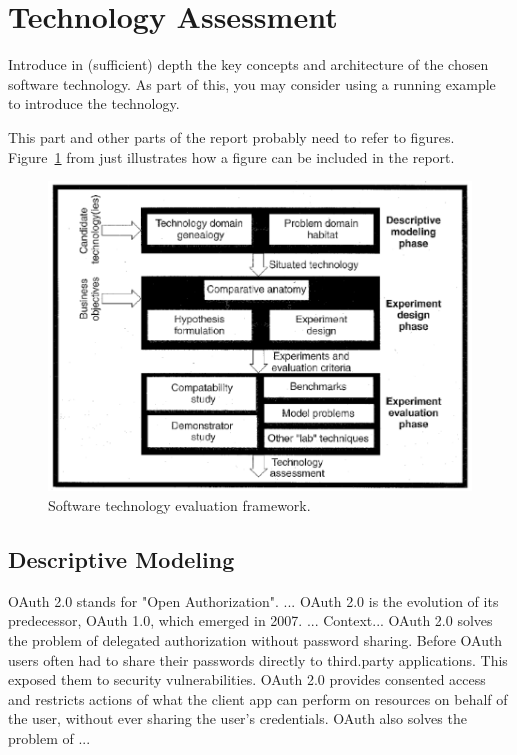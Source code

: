 \section{Technology Assessment}
\label{sec:technology}

Introduce in (sufficient) depth the key concepts and architecture of the chosen software technology. As part of this, you may consider using a running example to introduce the technology.

This part and other parts of the report probably need to refer to
figures. Figure~\ref{fig:framework} from \cite{brown:96} just
illustrates how a figure can be included in the report.

\begin{figure}[thb]
	\centering
	\includegraphics[scale=0.5]{figs/framework.png}
	\caption{Software technology evaluation framework.}
	\label{fig:framework}
\end{figure}

\subsection{Descriptive Modeling}
OAuth 2.0 stands for "Open Authorization". ...
OAuth 2.0 is the evolution of its predecessor, OAuth 1.0, which emerged in 2007. ...
Context...
OAuth 2.0 solves the problem of delegated authorization without password sharing. Before OAuth users often had to share their passwords directly to third.party applications. This exposed them to security vulnerabilities. OAuth 2.0 provides consented access and restricts actions of what the client app can perform on resources on behalf of the user, without ever sharing the user's credentials.
OAuth also solves the problem of ...


